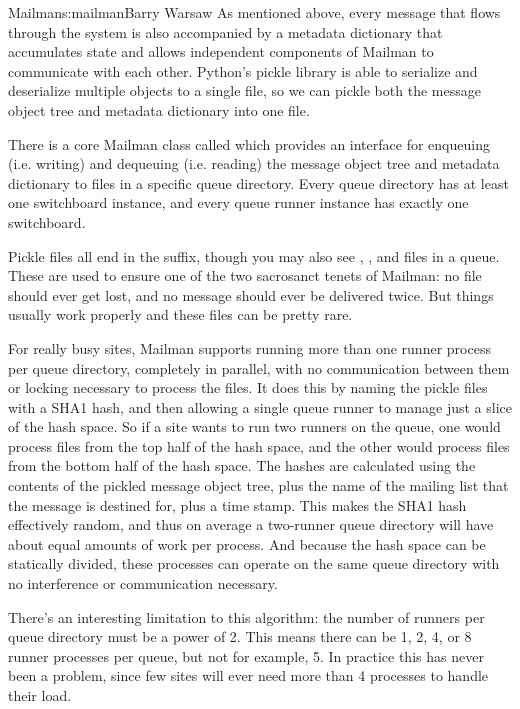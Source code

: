 \begin{aosachapter}{Mailman}{s:mailman}{Barry Warsaw}
As mentioned above, every message that flows through the system is also
accompanied by a metadata dictionary that accumulates state and allows
independent components of Mailman to communicate with each other.  Python's
pickle library is able to serialize and deserialize multiple objects to a
single file, so we can pickle both the message object tree and metadata
dictionary into one file.

There is a core Mailman class called  which provides an
interface for enqueuing (i.e. writing) and dequeuing (i.e. reading) the
message object tree and metadata dictionary to files in a specific queue
directory.  Every queue directory has at least one switchboard instance, and
every queue runner instance has exactly one switchboard.

Pickle files all end in the  suffix, though you may also see ,
, and  files in a queue.  These are used to ensure one of the
two sacrosanct tenets of Mailman: no file should ever get lost, and no message
should ever be delivered twice.  But things usually work properly and these
files can be pretty rare.

For really busy sites, Mailman supports running more than one runner process
per queue directory, completely in parallel, with no communication between
them or locking necessary to process the files.  It does this by naming the
pickle files with a SHA1 hash, and then allowing a single queue runner to
manage just a slice of the hash space.  So if a site wants to run two runners
on the  queue, one would process files from the top half of the
hash space, and the other would process files from the bottom half of the hash
space.  The hashes are calculated using the contents of the pickled message
object tree, plus the name of the mailing list that the message is destined
for, plus a time stamp.  This makes the SHA1 hash effectively random, and thus
on average a two-runner queue directory will have about equal amounts of work
per process.  And because the hash space can be statically divided, these
processes can operate on the same queue directory with no interference or
communication necessary.

There's an interesting limitation to this algorithm: the number of runners per
queue directory must be a power of 2.  This means there can be 1, 2, 4, or 8
runner processes per queue, but not for example, 5.  In practice this has
never been a problem, since few sites will ever need more than 4 processes to
handle their load.


\end{aosachapter}
